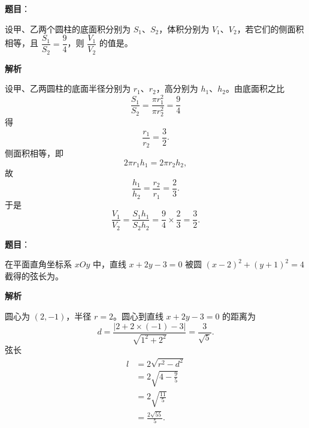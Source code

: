 \begin{answer}

\textbf{题目}：

设甲、乙两个圆柱的底面积分别为 $S_1$、$S_2$，体积分别为 $V_1$、$V_2$，若它们的侧面积相等，且 $\dfrac{S_1}{S_2}=\dfrac94$，则 $\dfrac{V_1}{V_2}$ 的值是\gkblank{}。

\textbf{解析}

设甲、乙两圆柱的底面半径分别为 $r_1$、$r_2$，高分别为 $h_1$、$h_2$。由底面积之比
\nopagebreak[4]
\[\frac{S_1}{S_2}=\frac{\pi r_1^2}{\pi r_2^2}=\frac94\]
得
\nopagebreak[4]
\[\frac{r_1}{r_2}=\frac32.\]
侧面积相等，即
\nopagebreak[4]
\[2\pi r_1h_1=2\pi r_2h_2,\]
故
\nopagebreak[4]
\[\frac{h_1}{h_2}=\frac{r_2}{r_1}=\frac23.\]
于是
\nopagebreak[4]
\[\frac{V_1}{V_2}=\frac{S_1h_1}{S_2h_2}=\frac94\times\frac23=\frac32.\]


\end{answer}
\begin{answer}

\textbf{题目}：

在平面直角坐标系 $xOy$ 中，直线 $x+2y-3=0$ 被圆 $(x-2)^2+(y+1)^2=4$ 截得的弦长为\gkblank{}。

\textbf{解析}

圆心为 $(2,-1)$，半径 $r=2$。圆心到直线 $x+2y-3=0$ 的距离为
\nopagebreak[4]
\[d=\frac{|2+2\times(-1)-3|}{\sqrt{1^2+2^2}}=\frac{3}{\sqrt5}.\]
弦长
\nopagebreak[4]
\[\begin{aligned}
l&=2\sqrt{r^2-d^2}\\
&=2\sqrt{4-\frac95}\\
&=2\sqrt{\frac{11}5}\\
&=\frac{2\sqrt{55}}5.
\end{aligned}\]


\end{answer}
